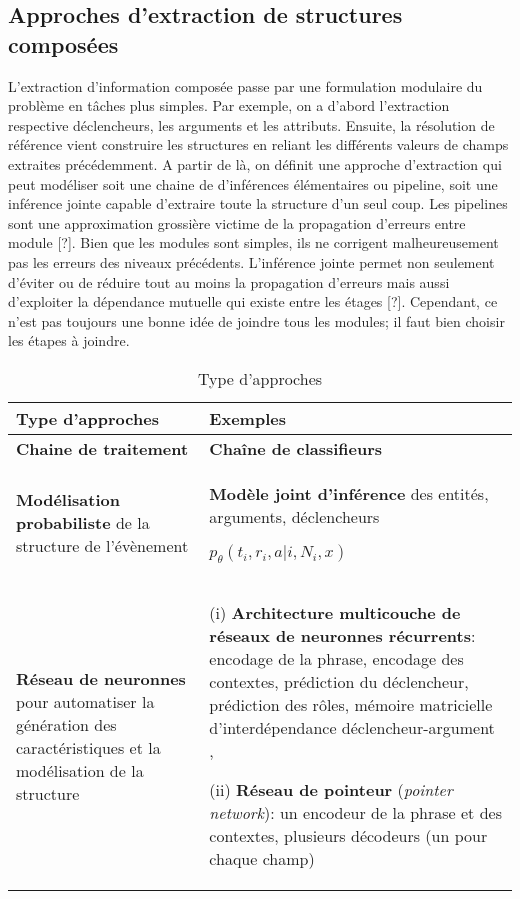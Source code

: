\subsection{Approches d'extraction de structures composées}
L'extraction d'information composée passe par une formulation modulaire du problème en tâches plus simples. Par exemple, on a d'abord l'extraction respective déclencheurs, les arguments et les attributs. Ensuite, la résolution de référence vient construire les structures en reliant les différents valeurs de champs extraites précédemment. A partir de là, on définit une approche d'extraction qui peut modéliser soit une chaine de d'inférences élémentaires ou pipeline, soit une inférence jointe capable d'extraire toute la structure d'un seul coup. Les pipelines sont une approximation grossière victime de la propagation d'erreurs entre module [?]. Bien que les modules sont simples, ils ne corrigent malheureusement pas les erreurs des niveaux précédents. L'inférence jointe permet non seulement d'éviter ou de réduire tout au moins la propagation d'erreurs mais aussi d'exploiter la dépendance mutuelle qui existe entre les étages [?]. Cependant, ce n'est pas toujours une bonne idée de joindre tous les modules; il faut bien choisir les étapes à joindre.


\begin{table}[!h]
\small
\begin{tabular}{|p{}|p{}|}
\hline
\textbf{Type d'approches} & \textbf{Exemples} \\ \hline
\textbf{Chaine de traitement} & \textbf{Chaîne de classifieurs  }\cite{ahn2006stages} \\ \hline
\textbf{Modélisation probabiliste} de la structure de l'évènement & \textbf{Modèle joint d'inférence} des entités, arguments, déclencheurs

$p_\theta(t_i, r_i, a \vert i, N_i, x)$ \cite{yang2016jointEntityEvt} %
\\ \hline
\textbf{Réseau de neuronnes} pour automatiser la génération des caractéristiques et la modélisation de la structure & (i) \textbf{Architecture multicouche de réseaux de neuronnes récurrents}: encodage de la phrase, encodage des contextes, prédiction du déclencheur, prédiction des rôles, mémoire matricielle d'interdépendance déclencheur-argument \cite{nguyen2016jointtrgarg},  

(ii) \textbf{Réseau de pointeur} (\textit{pointer network}): un encodeur de la phrase et des contextes, plusieurs décodeurs (un pour chaque champ) \cite{palm2017e2e-dnn} \\ \hline
\end{tabular}
\caption{Type d'approches}
\end{table}


